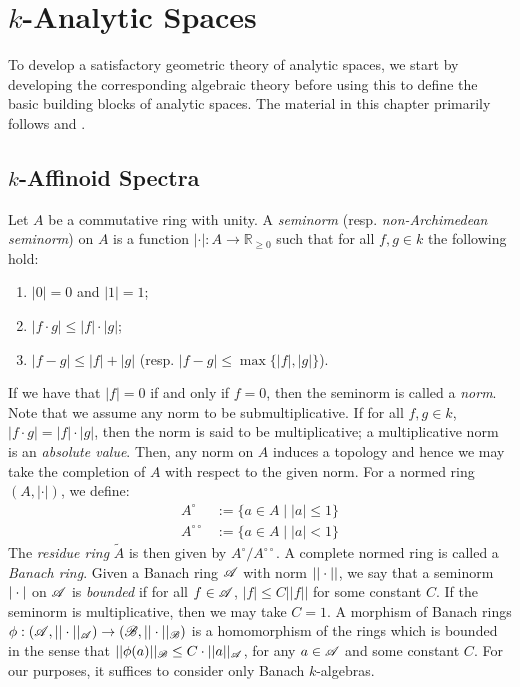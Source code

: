 
\chapter{$k$-Analytic Spaces}

To develop a satisfactory geometric theory of analytic spaces, we start by developing the corresponding algebraic theory before using this to define the basic building blocks of analytic spaces. The material in this chapter primarily follows \parencite{berk1} and \parencite{temk}.

\section{$k$-Affinoid Spectra}

Let $A$ be a commutative ring with unity.
A \textit{seminorm} (resp. \textit{non-Archimedean seminorm}) on $A$ is a function $|\cdot|: A \to \mathbb{R}_{\geq 0}$ such that for all $f, g \in k$ the following hold:
\begin{enumerate}
    \item $|0| = 0$ and $|1| = 1$;
    \item $|f \cdot g| \leq |f| \cdot |g|$;
    \item $|f - g| \leq |f| + |g|$ (resp. $|f - g| \leq \max \{|f|, |g|\}$).
\end{enumerate}

If we have that $|f| = 0$ if and only if $f = 0$, then the seminorm is called a \textit{norm}.
Note that we assume any norm to be submultiplicative.
If for all $f, g \in k$, $|f \cdot g| = |f| \cdot |g|$, then the norm is said to be multiplicative; a multiplicative norm is an \textit{absolute value}. 
Then, any norm on $A$ induces a topology and hence we may take the completion of $A$ with respect to the given norm.
For a normed ring $(A, |\cdot|)$, we define:
\begin{align*}
A^{\circ} & := \{ a \in A \; | \; |a| \leq 1\} \\
A^{\circ\circ} & := \{ a \in A \; | \; |a| < 1\}    
\end{align*}
The \textit{residue ring} $\tilde A$ is then given by $A^{\circ}/A^{\circ\circ}$.
A complete normed ring is called a \textit{Banach ring}. 
Given a Banach ring $\mathscr{A}$ with norm $||\cdot||$, we say that a seminorm $|\cdot|$ on $\mathscr{A}$ is \textit{bounded} if for all $f \in \mathscr{A}$, $|f| \leq C||f||$ for some constant $C$. 
If the seminorm is multiplicative, then we may take $C = 1$.
A morphism of Banach rings $\phi: (\mathscr{A}, ||\cdot||_{\mathscr{A}}) \to (\mathscr{B}, ||\cdot||_{\mathscr{B}})$ is a homomorphism of the rings which is bounded in the sense that $||\phi(a)||_{\mathscr{B}} \leq C \cdot ||a||_{\mathscr{A}}$, for any $a \in \mathscr{A}$ and some constant $C$. For our purposes, it suffices to consider only Banach $k$-algebras.

